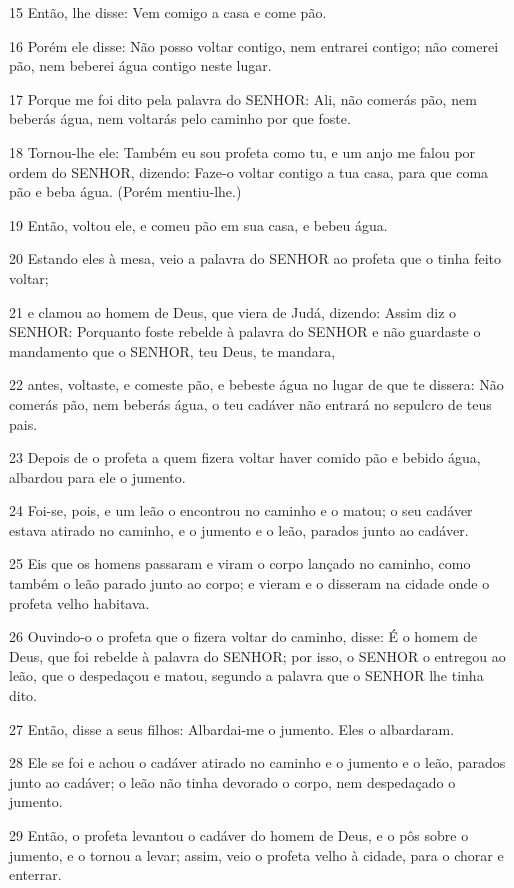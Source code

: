 \par 15 Então, lhe disse: Vem comigo a casa e come pão.
\par 16 Porém ele disse: Não posso voltar contigo, nem entrarei contigo; não comerei pão, nem beberei água contigo neste lugar.
\par 17 Porque me foi dito pela palavra do SENHOR: Ali, não comerás pão, nem beberás água, nem voltarás pelo caminho por que foste.
\par 18 Tornou-lhe ele: Também eu sou profeta como tu, e um anjo me falou por ordem do SENHOR, dizendo: Faze-o voltar contigo a tua casa, para que coma pão e beba água. (Porém mentiu-lhe.)
\par 19 Então, voltou ele, e comeu pão em sua casa, e bebeu água.
\par 20 Estando eles à mesa, veio a palavra do SENHOR ao profeta que o tinha feito voltar;
\par 21 e clamou ao homem de Deus, que viera de Judá, dizendo: Assim diz o SENHOR: Porquanto foste rebelde à palavra do SENHOR e não guardaste o mandamento que o SENHOR, teu Deus, te mandara,
\par 22 antes, voltaste, e comeste pão, e bebeste água no lugar de que te dissera: Não comerás pão, nem beberás água, o teu cadáver não entrará no sepulcro de teus pais.
\par 23 Depois de o profeta a quem fizera voltar haver comido pão e bebido água, albardou para ele o jumento.
\par 24 Foi-se, pois, e um leão o encontrou no caminho e o matou; o seu cadáver estava atirado no caminho, e o jumento e o leão, parados junto ao cadáver.
\par 25 Eis que os homens passaram e viram o corpo lançado no caminho, como também o leão parado junto ao corpo; e vieram e o disseram na cidade onde o profeta velho habitava.
\par 26 Ouvindo-o o profeta que o fizera voltar do caminho, disse: É o homem de Deus, que foi rebelde à palavra do SENHOR; por isso, o SENHOR o entregou ao leão, que o despedaçou e matou, segundo a palavra que o SENHOR lhe tinha dito.
\par 27 Então, disse a seus filhos: Albardai-me o jumento. Eles o albardaram.
\par 28 Ele se foi e achou o cadáver atirado no caminho e o jumento e o leão, parados junto ao cadáver; o leão não tinha devorado o corpo, nem despedaçado o jumento.
\par 29 Então, o profeta levantou o cadáver do homem de Deus, e o pôs sobre o jumento, e o tornou a levar; assim, veio o profeta velho à cidade, para o chorar e enterrar.
